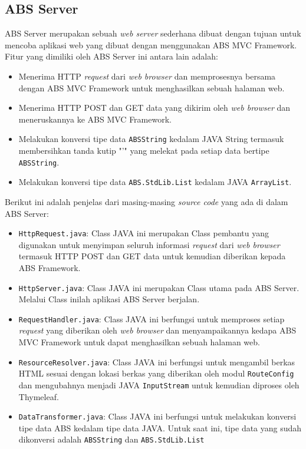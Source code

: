 \subsection{ABS Server}

ABS Server merupakan sebuah \textit{web server} sederhana dibuat dengan tujuan untuk mencoba aplikasi web yang dibuat dengan menggunakan ABS MVC Framework. Fitur yang dimiliki oleh ABS Server ini antara lain adalah:

\begin{itemize}
    \item Menerima HTTP \textit{request} dari \textit{web browser} dan memprosesnya bersama dengan ABS MVC Framework untuk menghasilkan sebuah halaman web.
    \item Menerima HTTP POST dan GET data yang dikirim oleh \textit{web browser} dan meneruskannya ke ABS MVC Framework.
    \item Melakukan konversi tipe data \texttt{ABSString} kedalam JAVA String termasuk membersihkan tanda kutip "'" yang melekat pada setiap data bertipe \texttt{ABSString}.
    \item Melakukan konversi tipe data \texttt{ABS.StdLib.List} kedalam JAVA \texttt{ArrayList}.
\end{itemize}

Berikut ini adalah penjelas dari masing-masing \textit{source code} yang ada di dalam ABS Server:

\begin{itemize}
    \item \texttt{HttpRequest.java}: Class JAVA ini merupakan Class pembantu yang digunakan untuk menyimpan seluruh informasi \textit{request} dari \textit{web browser} termasuk HTTP POST dan GET data untuk kemudian diberikan kepada ABS Framework.
    \item \texttt{HttpServer.java}: Class JAVA ini merupakan Class utama pada ABS Server. Melalui Class inilah aplikasi ABS Server berjalan.
    \item \texttt{RequestHandler.java}: Class JAVA ini berfungsi untuk memproses setiap \textit{request} yang diberikan oleh \textit{web browser} dan menyampaikannya kedapa ABS MVC Framework untuk dapat menghasilkan sebuah halaman web.
    \item \texttt{ResourceResolver.java}: Class JAVA ini berfungsi untuk mengambil berkas HTML sesuai dengan lokasi berkas yang diberikan oleh modul \texttt{RouteConfig} dan mengubahnya menjadi JAVA \texttt{InputStream} untuk kemudian diproses oleh Thymeleaf.
    \item \texttt{DataTransformer.java}: Class JAVA ini berfungsi untuk melakukan konversi tipe data ABS kedalam tipe data JAVA. Untuk saat ini, tipe data yang sudah dikonversi adalah \texttt{ABSString} dan \texttt{ABS.StdLib.List}
\end{itemize}

